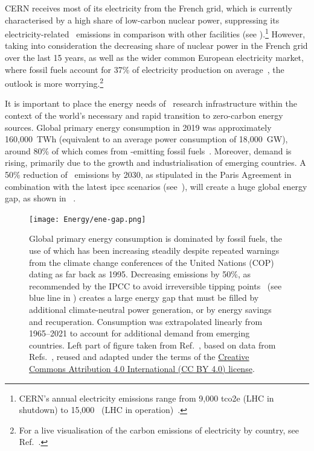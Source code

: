\documentclass[../SustainableHEP.tex]{subfiles}
\begin{document}
CERN receives most of its electricity from the French grid, which is currently characterised by a high share of low-carbon nuclear power, suppressing its electricity-related \CdO\ emissions in comparison with other facilities  (see ).\footnote{CERN's annual electricity emissions range from 9,000 \acrshort{tco2e} (LHC in shutdown) to 15,000 \tCdOe\ (LHC in operation)~\cite{Environment:2737239}.} However, taking into consideration the decreasing share of nuclear power in the French grid over the last 15 years, as well as the wider common European electricity market, where fossil fuels account for 37\% of electricity production on average~\cite{BPReport}, the outlook is more worrying.\footnote{For a live visualisation of the carbon emissions of electricity by country, see Ref.~\cite{ElectricityMap}.}

It is important to place the energy needs of \ACR\ research infrastructure within the context of the world's necessary and rapid transition to zero-carbon energy sources. Global primary energy consumption in 2019 was approximately 160,000~TWh (equivalent to an average power consumption of 18,000~GW), around 80\% of which comes from \CdO-emitting fossil fuels~\cite{OWDfuels}. Moreover, demand is rising, primarily due to the growth and industrialisation of emerging countries.  A 50\% reduction of \CdO\ emissions by 2030, as stipulated in the Paris Agreement in combination with the latest \acrshort{ipcc} scenarios (see~), will create a huge global energy gap, as shown in ~\cite{physikkonkret}. 


\begin{figure}[!ht]
     \centering
    \texttt{[image: Energy/ene-gap.png]}     
    \caption[Primary energy consumption is dominated by fossil fuels]%
        {Global primary energy consumption is dominated by fossil fuels, the use of which has been increasing steadily despite repeated warnings from the climate change conferences of the United Nations (COP) dating as far back as 1995. Decreasing emissions by 50\%, as recommended by the IPCC to avoid irreversible tipping points~\cite{OECDTippingPoints} (see blue line in ) creates a large energy gap that must be filled by additional climate-neutral power generation, or by energy savings and recuperation. Consumption was extrapolated linearly from 1965--2021 to account for additional demand from emerging countries. Left part of figure taken from Ref.~\cite{OWDgap}, based on data from Refs.~\cite{Smil,BP2022}, reused and adapted under the terms of the \href{https://creativecommons.org/licenses/by/4.0/}{Creative Commons Attribution 4.0 International (CC BY 4.0) license}.\label{fig:ene-gap}}
 \end{figure}
\end{document}
